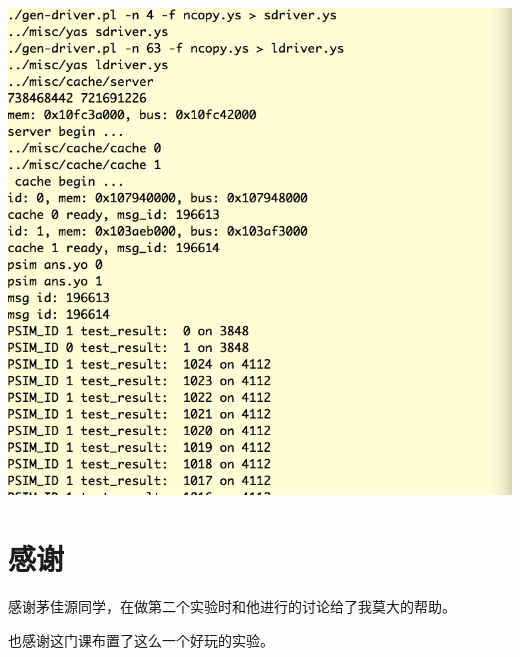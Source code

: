 \documentclass{article}
\theoremstyle{plain} \newtheorem{theorem}{常识}[section]
\theoremstyle{plain} \newtheorem{lizi}{例}[section]
\begin{document}
\includegraphics[scale=0.3]{1.png}
\section{感谢}
感谢茅佳源同学，在做第二个实验时和他进行的讨论给了我莫大的帮助。

也感谢这门课布置了这么一个好玩的实验。
\end{document}
